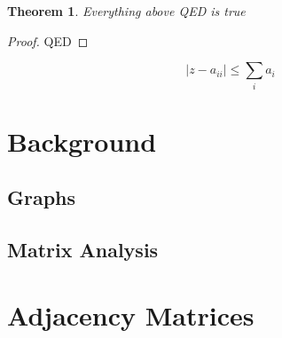 \documentclass{article}
\newtheorem{theorem}{Theorem}
\begin{document}
\begin{theorem}
Everything above QED is true
\end{theorem}
\begin{proof}
QED
\end{proof}


\[ |z-a_{ii}| \leq  \sum_{i} a_i\] 

\section*{Background}
\subsection*{Graphs}
\subsection*{Matrix Analysis}

\section*{Adjacency Matrices}
\end{document}
